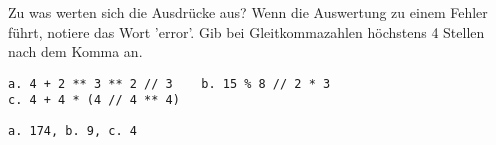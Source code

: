 \question[3]
Zu was werten sich die Ausdrücke aus? Wenn die Auswertung zu einem Fehler führt, notiere das
Wort 'error'. Gib bei Gleitkommazahlen höchstens 4 Stellen nach dem Komma an.
\begin{lstlisting}
a. 4 + 2 ** 3 ** 2 // 3    b. 15 % 8 // 2 * 3
c. 4 + 4 * (4 // 4 ** 4)
\end{lstlisting}
\begin{solutionbox}{2cm}
\begin{lstlisting}
a. 174, b. 9, c. 4
\end{lstlisting}
\end{solutionbox}
